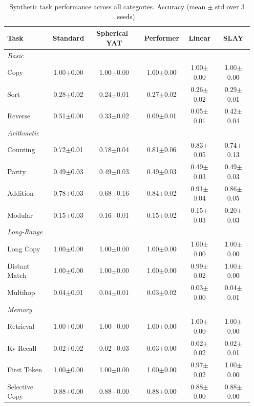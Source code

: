 \documentclass{article}
\begin{document}
\setlength{\textfloatsep}{8pt}
\begin{table}[t]
\centering
\small
\caption{Synthetic task performance across all categories. Accuracy (mean $\pm$ std over 3 seeds).}
\label{tab:tasks-all}
\begin{tabular}{lccccc}
\toprule
Task & Standard & Spherical--YAT & Performer & Linear & SLAY \\
\midrule
\multicolumn{6}{l}{\emph{Basic}} \\
Copy            & 1.00$\pm$0.00 & 1.00$\pm$0.00 & 1.00$\pm$0.00 & 1.00$\pm$0.00 & 1.00$\pm$0.00 \\
Sort            & 0.28$\pm$0.02 & 0.24$\pm$0.01 & 0.27$\pm$0.02 & 0.26$\pm$0.02 & 0.29$\pm$0.01 \\
Reverse         & 0.51$\pm$0.00 & 0.33$\pm$0.02 & 0.09$\pm$0.01 & 0.05$\pm$0.01 & 0.42$\pm$0.04 \\
\midrule
\multicolumn{6}{l}{\emph{Arithmetic}} \\
Counting        & 0.72$\pm$0.01 & 0.78$\pm$0.04 & 0.81$\pm$0.06 & 0.83$\pm$0.05 & 0.74$\pm$0.13 \\
Parity          & 0.49$\pm$0.03 & 0.49$\pm$0.03 & 0.49$\pm$0.03 & 0.49$\pm$0.03 & 0.49$\pm$0.03 \\
Addition        & 0.78$\pm$0.03 & 0.68$\pm$0.16 & 0.84$\pm$0.02 & 0.91$\pm$0.04 & 0.86$\pm$0.05 \\
Modular         & 0.15$\pm$0.03 & 0.16$\pm$0.01 & 0.15$\pm$0.02 & 0.15$\pm$0.03 & 0.20$\pm$0.03 \\
\midrule
\multicolumn{6}{l}{\emph{Long-Range}} \\
Long Copy       & 1.00$\pm$0.00 & 1.00$\pm$0.00 & 1.00$\pm$0.00 & 1.00$\pm$0.00 & 1.00$\pm$0.00 \\
Distant Match   & 1.00$\pm$0.00 & 1.00$\pm$0.00 & 1.00$\pm$0.00 & 0.99$\pm$0.02 & 1.00$\pm$0.00 \\
Multihop        & 0.04$\pm$0.01 & 0.04$\pm$0.01 & 0.03$\pm$0.02 & 0.03$\pm$0.00 & 0.04$\pm$0.01 \\
\midrule
\multicolumn{6}{l}{\emph{Memory}} \\
Retrieval       & 1.00$\pm$0.00 & 1.00$\pm$0.00 & 1.00$\pm$0.00 & 1.00$\pm$0.00 & 1.00$\pm$0.00 \\
Kv Recall       & 0.02$\pm$0.02 & 0.02$\pm$0.03 & 0.03$\pm$0.00 & 0.02$\pm$0.02 & 0.02$\pm$0.01 \\
First Token     & 1.00$\pm$0.00 & 1.00$\pm$0.00 & 1.00$\pm$0.00 & 0.97$\pm$0.02 & 1.00$\pm$0.00 \\
Selective Copy  & 0.88$\pm$0.00 & 0.88$\pm$0.00 & 0.88$\pm$0.00 & 0.88$\pm$0.00 & 0.88$\pm$0.00 \\

\end{tabular}
\end{table}
\end{document}
